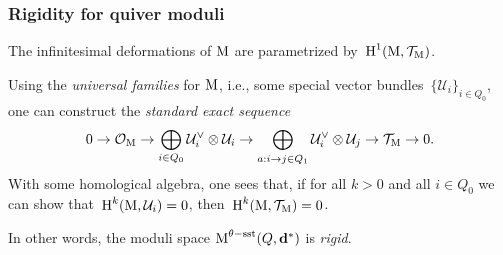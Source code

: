 \documentclass{beamer}
\begin{document}
\begin{frame}
    \frametitle{Rigidity for quiver moduli}
The infinitesimal deformations of $\operatorname{M}$ are parametrized
by~$\operatorname{H}^1(\operatorname{M}, \mathcal{T}_{\operatorname{M}})$. \pause

Using the \emph{universal families} for $\operatorname{M}$, i.e.,
some special vector bundles~$\{\mathcal{U}_i\}_{i \in Q_0}$,
one can construct the \emph{standard exact sequence}
\begin{equation}\label{equation:4-term-exact-sequence}
0
\overset{}{\rightarrow}\mathcal{O}_{\operatorname{M}}
\overset{}{\rightarrow}\bigoplus_{i \in Q_0} \mathcal{U}^\vee_i \otimes \mathcal{U}_i
\overset{}{\rightarrow}\bigoplus_{a: i \overset{}{\rightarrow} j \in Q_1} \mathcal{U}^\vee_{i} \otimes \mathcal{U}_{j}
\overset{}{\rightarrow}\mathcal{T}_{\operatorname{M}}
\overset{}{\rightarrow} 0.
\end{equation} \pause
With some homological algebra, one sees that, if for all $k > 0$ and all $i \in Q_0$
we can show that~$\operatorname{H}^k(\operatorname{M}, \mathcal{U}_i) = 0$,
then~$\operatorname{H}^k(\operatorname{M}, \mathcal{T}_{\operatorname{M}}) = 0$. \pause

In other words, the moduli space $\operatorname{M}^{\theta-\mathrm{sst}}(Q, \mathbf{d}^*)$
is \emph{rigid}.
\end{frame}


\end{document}
